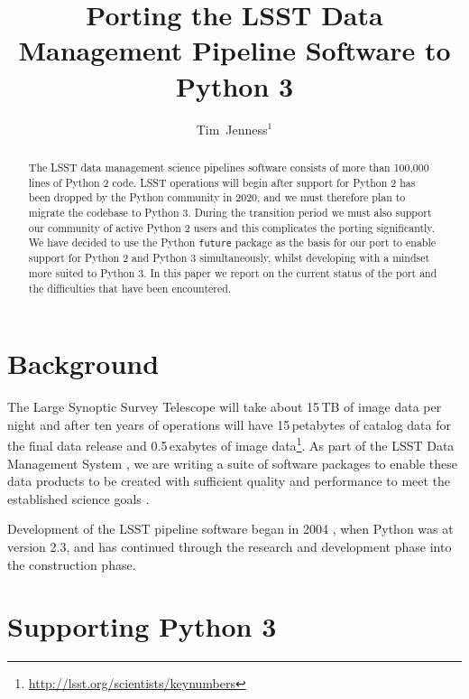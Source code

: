 \documentclass[11pt,twoside]{article}
\begin{document}
\newcommand{\arxiv}[1]{\href{http://arxiv.org/abs/#1}{arXiv:#1}}
\title{Porting the LSST Data Management Pipeline Software to Python 3}
\author{Tim~Jenness$^1$
}


\begin{abstract}
The LSST data management science pipelines software consists of more than 100,000 lines of Python 2 code.
LSST operations will begin after support for Python 2 has been dropped by the Python community in 2020, and we must therefore plan to migrate the codebase to Python 3.
During the transition period we must also support our community of active Python 2 users and this complicates the porting significantly.
We have decided to use the Python \texttt{future} package as the basis for our port to enable support for Python 2 and Python 3 simultaneously, whilst developing with a mindset more suited to Python 3.
In this paper we report on the current status of the port and the difficulties that have been encountered.
\end{abstract}

\section{Background}

The Large Synoptic Survey Telescope \citep[LSST;][]{2008arXiv0805.2366I} will take about 15\,TB of image data per night and after ten years of operations will have 15\,petabytes of catalog data for the final data release and 0.5\,exabytes of image data\footnote{\url{http://lsst.org/scientists/keynumbers}}.
As part of the LSST Data Management System \citep{2015arXiv151207914J}, we are writing a suite of software packages to enable these data products to be created with sufficient quality and performance to meet the established science goals \citep{2009arXiv0912.0201L}.

Development of the LSST pipeline software began in 2004 \citep{2004AAS...20510811A}, when Python was at version 2.3, and has continued through the research and development phase \citep{}into the construction phase.

\section{Supporting Python 3}
\end{document}
